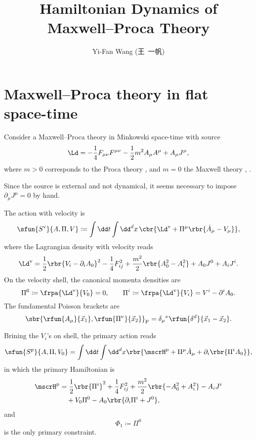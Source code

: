\documentclass[a4paper,11pt]{article}
\title{Hamiltonian Dynamics of Maxwell--Proca Theory}
\author{Yi-Fan Wang (王\ 一帆)}
\begin{document}
\maketitle


\section{Maxwell--Proca theory in flat space-time}

Consider a Maxwell--Proca theory in Minkowski space-time with source
\begin{equation}
\Ld = -\frac{1}{4} F_{\mu\nu} F^{\mu\nu} - \frac{1}{2} m^2 A_\mu A^\mu
+ A_\mu J^\mu,
\end{equation}
where $m > 0$ corresponds to the Proca theory \cite[sec.\ 2.3]{Gitman1990}, and 
$m = 0$ the Maxwell theory \cite[sec.\ 3.3.3]{Rothe2010}, \cite[sec.\ 
2.4]{Gitman1990}.

Since the source is external and not dynamical, it seems necessary to impose 
$\partial_\mu J^\mu = 0$ by hand.

The action with velocity is
\begin{align}
\sfun{S^\text{v}}{A, \Pi, V} \coloneqq \int\dd t\int\dd^d x\,
\cbr{\Ld^\text{v} + \Pi^\mu\rbr{\dot A_\mu-V_\mu}},
\end{align}
where the Lagrangian density with velocity reads
\begin{align}
\Ld^\text{v} = \frac{1}{2} \rbr{V_i - \partial_i A_0}^2 - \frac{1}{4} F_{ij}^2 
+ \frac{m^2}{2} \rbr{A_0^2 - A_i^2} + A_0 J^0 + A_i J^i.
\label{eq:lagrangian-density-with-velocity}
\end{align}
On the velocity shell, the canonical momenta densities are
\begin{equation}
\Pi^0 \coloneqq \frpa{\Ld^\text{v}}{V_0} = 0,\qquad
\Pi^i \coloneqq \frpa{\Ld^\text{v}}{V_i} = V^i - \partial^i A_0.
\end{equation}
The fundamental Poisson brackets are
\begin{equation}
\sbr{\rfun{A_\mu}{\vec x_1}, \rfun{\Pi^\nu}{\vec x_2}}_\text{P} =
\delta_\mu{}^\nu\rfun{\delta^d}{\vec x_1 - \vec x_2}.
\end{equation}

Brining the $V_i$'s on shell, the primary action reads
\begin{align}
\sfun{S^\text{p}}{A, \Pi, V_0} = \int \dd t\int\dd^d x
\rbr{\mscrH^\text{p}+\Pi^\mu \dot A_\mu + \partial_i\rbr{\Pi^i A_0}},
\end{align}
in which the primary Hamiltonian is
\begin{align}
\mscrH^\text{p} &= \frac{1}{2} \rbr{\Pi^i}^2 + \frac{1}{4} F_{ij}^2 + 
\frac{m^2}{2} \rbr{-A_0^2 + A_i^2} - A_i J^i \nonumber \\
&\quad + V_0 \Pi^0 - A_0 \rbr{\partial_i \Pi^i + J^0},
\label{eq:primary-Hamil-general-MP}
\end{align}
and
\begin{equation}
\Phi_1 \coloneqq \Pi^0
\end{equation}
is the only primary constraint.
\end{document}
